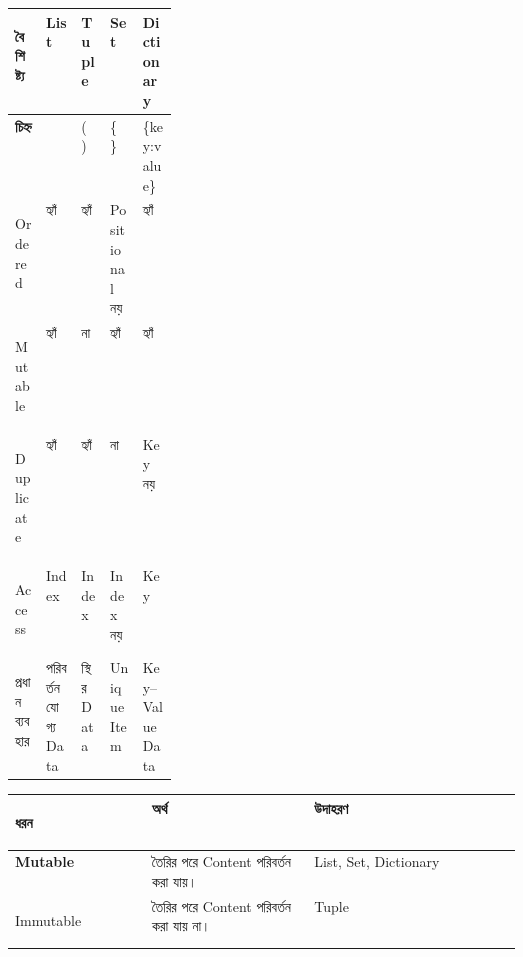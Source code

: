 

\begin{tabularx}
{\linewidth}
{
|>{\bfseries\RaggedRight\arraybackslash}p{0.19\linewidth}
|>{\centering\arraybackslash}Y
|>{\centering\arraybackslash}Y
|>{\centering\arraybackslash}Y
|>{\centering\arraybackslash}Y|
}

\hline
{}

\textbf{বৈশিষ্ট্য}
&
\textbf{List}
&
\textbf{Tuple}
&
\textbf{Set}
&
\textbf{Dictionary}
\\
\hline

চিহ্ন
&
\textenglish{\ttfamily [ ]}
&
\textenglish{\ttfamily ( )}
&
\textenglish{\ttfamily \{ \}}
&
\textenglish{\ttfamily \{key:value\}}
\\
\hline

Ordered
&
হ্যাঁ
&
হ্যাঁ
&
Positional নয়
&
হ্যাঁ
\\
\hline

Mutable
&
হ্যাঁ
&
না
&
হ্যাঁ
&
হ্যাঁ
\\
\hline

Duplicate
&
হ্যাঁ
&
হ্যাঁ
&
না
&
Key নয়
\\
\hline

Access
&
Index
&
Index
&
Index নয়
&
Key
\\
\hline

প্রধান ব্যবহার
&
পরিবর্তনযোগ্য Data
&
স্থির Data
&
Unique Item
&
Key--Value Data
\\
\hline

\end{tabularx}



\begin{tabularx}
{\linewidth}
{
|>{\bfseries\RaggedRight\arraybackslash}p{0.27\linewidth}
|>{\RaggedRight\arraybackslash}p{0.32\linewidth}
|Y|
}

\hline
{}

\textbf{ধরন}
&
\textbf{অর্থ}
&
\textbf{উদাহরণ}
\\
\hline

Mutable
&
তৈরির পরে Content পরিবর্তন করা যায়।
&
List, Set, Dictionary
\\
\hline

Immutable
&
তৈরির পরে Content পরিবর্তন করা যায় না।
&
Tuple
\\
\hline

\end{tabularx}

